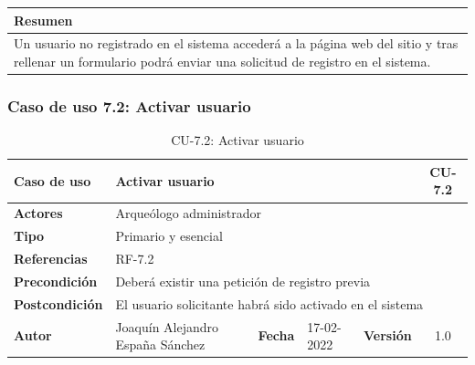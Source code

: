    \begin{table}[H]
        \centering
        \begin{tabularx}{\textwidth}{@{} |L |@{}} \hline
            \textbf{Resumen} \\
            \hline
            Un usuario no registrado en el sistema accederá a la página web del sitio y tras
            rellenar un formulario podrá enviar una solicitud de registro en el sistema. \\
            \hline
        \end{tabularx}
    \end{table}


\subsubsection{Caso de uso 7.2: Activar usuario}

    \begin{table}[H]
    \begin{center}
        \begin{adjustbox}{width=\textwidth}
        \begin{tabular}{ | l | l | l | l | c | c | } 
            \hline
            \textbf{Caso de uso} & \multicolumn{4}{l|}{Activar usuario} & \cellcolor{gray!50} \textbf{CU-7.2}\\
            \hline
            \textbf{Actores} & \multicolumn{5}{p{0.9\linewidth}|}{Arqueólogo administrador} \\
            \hline
            \textbf{Tipo} & \multicolumn{5}{l|}{Primario y esencial} \\
            \hline
            \textbf{Referencias} & \multicolumn{3}{l|}{RF-7.2} & \multicolumn{2}{l|}{ }\\
            \hline
            \textbf{Precondición} & \multicolumn{5}{l|}{Deberá existir una petición de registro previa} \\
            \hline
            \textbf{Postcondición} & \multicolumn{5}{l|}{El usuario solicitante habrá sido activado en el sistema} \\
            \hline
            \textbf{Autor} & \multicolumn{1}{p{0.25\linewidth}|}{Joaquín Alejandro España Sánchez} & \textbf{Fecha} & 
            17-02-2022     & \textbf{Versión}                                                      & 1.0\\
            \hline
        \end{tabular}
        \end{adjustbox}
        \caption{CU-7.2: Activar usuario}
        \label{tab:activate-user}
    \end{center}
    \end{table}

